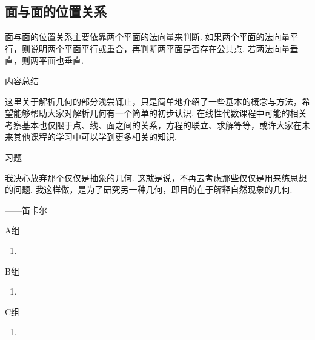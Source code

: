 \subsection{面与面的位置关系}

面与面的位置关系主要依靠两个平面的法向量来判断. 如果两个平面的法向量平行，则说明两个平面平行或重合，再判断两平面是否存在公共点. 若两法向量垂直，则两平面也垂直.

\vspace{2ex}
\centerline{\heiti \Large 内容总结}

这里关于解析几何的部分浅尝辄止，只是简单地介绍了一些基本的概念与方法，希望能够帮助大家对解析几何有一个简单的初步认识. 在线性代数课程中可能的相关考察基本也仅限于点、线、面之间的关系，方程的联立、求解等等，或许大家在未来其他课程的学习中可以学到更多相关的知识.

\vspace{2ex}
\centerline{\heiti \Large 习题}

\vspace{2ex}
{\kaishu 我决心放弃那个仅仅是抽象的几何. 这就是说，不再去考虑那些仅仅是用来练思想的问题. 我这样做，是为了研究另一种几何，即目的在于解释自然现象的几何.}
\begin{flushright}
    \kaishu
    ——笛卡尔
\end{flushright}

\centerline{\heiti A组}
\begin{enumerate}
    \item
\end{enumerate}

\centerline{\heiti B组}
\begin{enumerate}
    \item
\end{enumerate}

\centerline{\heiti C组}
\begin{enumerate}
    \item
\end{enumerate}
